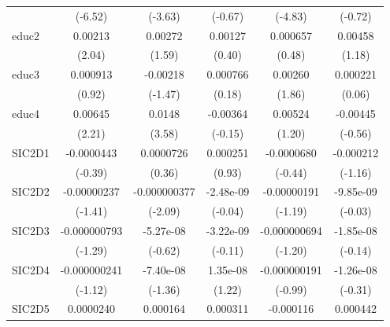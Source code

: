 \begin{table}[htbp]
\begin{tabular}{l*{5}{c}}
            &     (-6.52)         &     (-3.63)         &     (-0.67)         &     (-4.83)         &     (-0.72)         \\
educ2       &     0.00213\sym{*}  &     0.00272         &     0.00127         &    0.000657         &     0.00458         \\
            &      (2.04)         &      (1.59)         &      (0.40)         &      (0.48)         &      (1.18)         \\
educ3       &    0.000913         &    -0.00218         &    0.000766         &     0.00260         &    0.000221         \\
            &      (0.92)         &     (-1.47)         &      (0.18)         &      (1.86)         &      (0.06)         \\
educ4       &     0.00645\sym{*}  &      0.0148\sym{***}&    -0.00364         &     0.00524         &    -0.00445         \\
            &      (2.21)         &      (3.58)         &     (-0.15)         &      (1.20)         &     (-0.56)         \\
SIC2D1      &  -0.0000443         &   0.0000726         &    0.000251         &  -0.0000680         &   -0.000212         \\
            &     (-0.39)         &      (0.36)         &      (0.93)         &     (-0.44)         &     (-1.16)         \\
SIC2D2      & -0.00000237         &-0.000000377\sym{*}  &   -2.48e-09         & -0.00000191         &   -9.85e-09         \\
            &     (-1.41)         &     (-2.09)         &     (-0.04)         &     (-1.19)         &     (-0.03)         \\
SIC2D3      &-0.000000793         &   -5.27e-08         &   -3.22e-09         &-0.000000694         &   -1.85e-08         \\
            &     (-1.29)         &     (-0.62)         &     (-0.11)         &     (-1.20)         &     (-0.14)         \\
SIC2D4      &-0.000000241         &   -7.40e-08         &    1.35e-08         &-0.000000191         &   -1.26e-08         \\
            &     (-1.12)         &     (-1.36)         &      (1.22)         &     (-0.99)         &     (-0.31)         \\
SIC2D5      &   0.0000240         &    0.000164         &    0.000311         &   -0.000116         &    0.000442         \\

\end{tabular}
\end{table}
